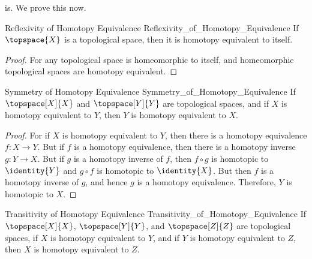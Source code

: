         is. We prove this now.
        \begin{ltheorem}{Reflexivity of Homotopy Equivalence}
                        {Reflexivity_of_Homotopy_Equivalence}
            If $\topspace{X}$ is a topological space, then it is
            homotopy equivalent to itself.
        \end{ltheorem}
        \begin{proof}
            For any topological space is homeomorphic to itself, and
            homeomorphic topological spaces are homotopy equivalent.
        \end{proof}
        \begin{ltheorem}{Symmetry of Homotopy Equivalence}
                        {Symmetry_of_Homotopy_Equivalence}
            If $\topspace[X]{X}$ and $\topspace[Y]{Y}$ are topological
            spaces, and if $X$ is homotopy equivalent to $Y$, then
            $Y$ is homotopy equivalent to $X$.
        \end{ltheorem}
        \begin{proof}
            For if $X$ is homotopy equivalent to $Y$, then there is a
            homotopy equivalence $f:X\rightarrow{Y}$. But if $f$ is a
            homotopy equivalence, then there is a homotopy inverse
            $g:Y\rightarrow{X}$. But if $g$ is a homotopy inverse of
            $f$, then $f\circ{g}$ is homotopic to $\identity{Y}$ and
            $g\circ{f}$ is homotopic to $\identity{X}$. But then $f$ is
            a homotopy inverse of $g$, and hence $g$ is a homotopy
            equivalence. Therefore, $Y$ is homotopic to $X$.
        \end{proof}
        \begin{ltheorem}{Transitivity of Homotopy Equivalence}
                        {Transitivity_of_Homotopy_Equivalence}
            If $\topspace[X]{X}$, $\topspace[Y]{Y}$, and
            $\topspace[Z]{Z}$ are topological spaces, if $X$ is homotopy
            equivalent to $Y$, and if $Y$ is homotopy equivalent to $Z$,
            then $X$ is homotopy equivalent to $Z$.
        \end{ltheorem}
